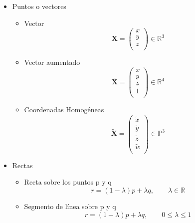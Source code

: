 \documentclass[main.tex]{subfiles}
\begin{document}
\begin{itemize}
\item Puntos o vectores
  \begin{itemize}
  \item Vector
    \begin{equation}
      \mathbf{X} = \left(
      \begin{array}{ccc}x \\y \\z \\\end{array} \right)
      \in{ \mathbb{R}^{3} }
    \end{equation}
  \item Vector aumentado
    \begin{equation}
      \mathbf{\bar{X}} = \left(
          \begin{array}{cccc}x \\y \\z \\1 \\
          \end{array}        \right) \in{\mathbb{R}^{4}}
    \end{equation}
  \item Coordenadas Homogéneas
    \begin{equation}
      \mathbf{\tilde{X}} = \left(
          \begin{array}{ccc}
            \tilde{x} \\ \tilde{y} \\ \tilde{z} \\ \tilde{w} \\
          \end{array}
        \right) \in \mathbb{P}^{3}
    \end{equation}
  \end{itemize}
\item Rectas
  \begin{itemize}
  \item Recta sobre los puntos p y q
    \begin{equation}
      r = (1 - \lambda)p + \lambda q
        ,\qquad
      \lambda \in \mathbb{R}
    \end{equation}
  \item Segmento de línea sobre p y q
    \begin{equation}
      r = (1-\lambda )p+\lambda q ,\qquad 0\leq \lambda  \leq 1
    \end{equation}
    \begin{figure}[h]

\end{figure}
\end{itemize}
\end{itemize}
\end{document}
